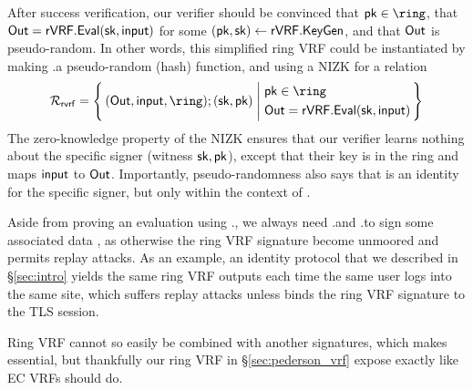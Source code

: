 After success verification, our verifier should be convinced that $\pk \in \ring$, that
${\mathsf{Out}} = {\mathsf{rVRF}}.{\mathsf{Eval}}(\mathsf{sk},\mathsf{input})$ for some $(\mathsf{pk},\mathsf{sk}) \leftarrow {\ensuremath{\mathsf{rVRF}}}.{\mathsf{KeyGen}}$,
and that ${\mathsf{Out}}$ is pseudo-random.
In other words, this simplified ring VRF could be instantiated by making
\rVRF.\Eval a pseudo-random (hash) function, and using a NIZK for a relation
$$ \rel_{\mathsf{rvrf}} = \Setst{ (\Out, \msg, \ring);(\sk,\pk)}{
	\eprint{
		(\pk,\sk) \leftarrow \rVRF.\KeyGen, \quad %
		\pk \in \ring, \quad
		\Out = \rVRF.\Eval(\sk,\msg)
	}{
		\begin{aligned}
			& \pk \in \ring \\
			& \Out = \rVRF.\Eval(\sk,\msg)
		\end{aligned}
	}
} $$
The zero-knowledge property of the NIZK ensures that our verifier learns nothing about the specific
signer (witness $ \mathsf{sk},\mathsf{pk} $), except that their key is in the ring and maps $\mathsf{input}$ to ${\mathsf{Out}}$.
Importantly, pseudo-randomness also says that \Out is an identity
for the specific signer, but only within the context of \msg.


Aside from proving an evaluation using \rVRF.\Eval, 
we always need \rVRF.\Sign and \rVRF.\Verify to sign some associated data \aux,
as otherwise the ring VRF signature become unmoored and permits replay attacks.
%
As an example, an identity protocol that we described in \S\ref{sec:intro}
yields the same ring VRF outputs each time the same user logs into the
same site, which suffers replay attacks unless \aux binds the
ring VRF signature to the TLS session.


Ring VRF cannot so easily be combined with another signatures, which
makes \aux essential,%
but thankfully our ring VRF in \S\ref{sec:pederson_vrf} expose \aux exactly like EC VRFs should do.%

